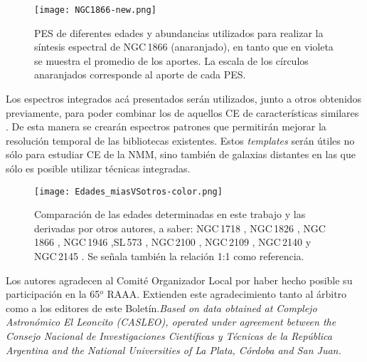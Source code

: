 \documentclass[baaa]{baaa}
\begin{document}
\begin{figure}
\centering
\texttt{[image: NGC1866-new.png]}
\caption{PES de diferentes edades y abundancias utilizados para realizar la síntesis espectral de NGC\,1866 (anaranjado), en tanto que en violeta se muestra el promedio de los aportes. La escala de los círculos anaranjados corresponde al aporte de cada PES. }
\label{F3}
\end{figure}

Los espectros integrados acá presentados serán utilizados, junto a otros obtenidos previamente, para poder combinar los de aquellos CE de características similares \citep{Minniti_2014}. De esta manera se crearán espectros patrones que permitirán mejorar la resolución temporal de las bibliotecas existentes. Estos {\it templates} serán útiles no sólo para estudiar CE de la NMM, sino también de galaxias distantes en las que sólo es posible utilizar técnicas integradas.


\begin{figure*}
\centering
\texttt{[image: Edades\_miasVSotros-color.png]}
\caption{Comparación de las edades determinadas en este trabajo y las derivadas por otros autores, a saber: NGC\,1718 \citep{Kapse2021}, NGC\,1826 \citep{Bica1996}, NGC\,1866 \citep{Milone2017}, NGC\,1946 \citep{Glatt2010},SL\,573 \citep{Bica1996}, NGC\,2100 \citep{Niederhofer2015}, NGC\,2109 \citep{Glatt2010}, NGC\,2140 \citep{Glatt2010} y NGC\,2145 \citep{Glatt2010}. Se señala también la relación 1:1 como referencia.} 
\label{F4}
\end{figure*}


\small

 

\begin{acknowledgement}
{Los autores agradecen al Comité Organizador Local por haber hecho posible su participación en la 65$^o$ RAAA. Extienden este agradecimiento tanto al árbitro como a los editores de este Boletín.\it Based on data obtained at Complejo Astronómico El Leoncito (CASLEO), operated under agreement between the Consejo Nacional de Investigaciones Científicas y Técnicas de la República Argentina and the National Universities of La Plata, Córdoba and San Juan.}
\end{acknowledgement}
\end{document}
